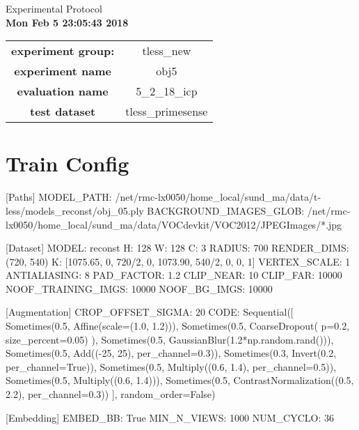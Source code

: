 \documentclass[a4paper,table]{article}
\begin{document}
\begin{center}
{\Huge Experimental Protocol}\\
\textbf{Mon Feb  5 23:05:43 2018}\\
\end{center}

\begin{table}[H]
    \centering
    \begin{adjustbox}{max width=\textwidth}
        \begin{tabular}{c|c}
            \textbf{experiment group:}& tless\_new\\
            \textbf{experiment name} & obj5  \\
            \textbf{evaluation name} & 5\_2\_18\_icp \\
            \textbf{test dataset} & tless\_primesense \\
        \end{tabular}
    \end{adjustbox}
\end{table}

\chapter{{\Large Train Config}}

[Paths]
MODEL\_PATH: /net/rmc-lx0050/home\_local/sund\_ma/data/t-less/models\_reconst/obj\_05.ply
BACKGROUND\_IMAGES\_GLOB: /net/rmc-lx0050/home\_local/sund\_ma/data/VOCdevkit/VOC2012/JPEGImages/*.jpg

[Dataset]
MODEL: reconst
H: 128
W: 128
C: 3
RADIUS: 700
RENDER\_DIMS: (720, 540)
K: [1075.65, 0, 720/2, 0, 1073.90, 540/2, 0, 0, 1]
VERTEX\_SCALE: 1
ANTIALIASING: 8
PAD\_FACTOR: 1.2
CLIP\_NEAR: 10
CLIP\_FAR: 10000
NOOF\_TRAINING\_IMGS: 10000
NOOF\_BG\_IMGS: 10000

[Augmentation]
CROP\_OFFSET\_SIGMA: 20
CODE: Sequential([
	Sometimes(0.5, Affine(scale=(1.0, 1.2))),
	Sometimes(0.5, CoarseDropout( p=0.2, size\_percent=0.05) ),
	Sometimes(0.5, GaussianBlur(1.2*np.random.rand())),
    Sometimes(0.5, Add((-25, 25), per\_channel=0.3)),
    Sometimes(0.3, Invert(0.2, per\_channel=True)),
    Sometimes(0.5, Multiply((0.6, 1.4), per\_channel=0.5)),
    Sometimes(0.5, Multiply((0.6, 1.4))),
    Sometimes(0.5, ContrastNormalization((0.5, 2.2), per\_channel=0.3))
	], random\_order=False)

[Embedding]
EMBED\_BB: True
MIN\_N\_VIEWS: 1000
NUM\_CYCLO: 36
\end{document}

